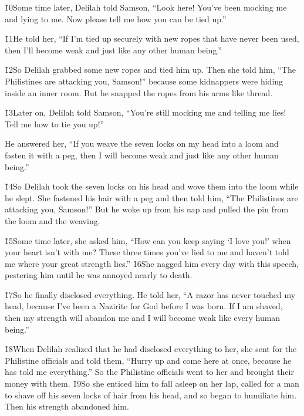 \v{10}Some time later, Delilah told Samson, ``Look here! You've been mocking me and lying to me. Now please tell me how you can be tied up.''

\v{11}He told her, ``If I'm tied up securely with new ropes that have never been used, then I'll become weak and just like any other human being.''

\v{12}So Delilah grabbed some new ropes and tied him up. Then she told him, ``The Philistines are attacking you, Samson!'' because some kidnappers were hiding inside an inner room. But he snapped the ropes from his arms like thread.

\v{13}Later on, Delilah told Samson, ``You're still mocking me and telling me lies! Tell me how to tie you up!''

He answered her, ``If you weave the seven locks on my head into a loom and fasten it with a peg, then I will become weak and just like any other human being.''

\v{14}So Delilah took the seven locks on his head and wove them into the loom while he slept. She fastened his hair with a peg and then told him, ``The Philistines are attacking you, Samson!'' But he woke up from his nap and pulled the pin from the loom and the weaving.

\v{15}Some time later, she asked him, ``How can you keep saying `I love you!' when your heart isn't with me? These three times you've lied to me and haven't told me where your great strength lies.'' \v{16}She nagged him every day with this speech, pestering him until he was annoyed nearly to death.

\v{17}So he finally disclosed everything. He told her, ``A razor has never touched my head, because I've been a Nazirite for God before I was born. If I am shaved, then my strength will abandon me and I will become weak like every human being.''

\v{18}When Delilah realized that he had disclosed everything to her, she sent for the Philistine officials and told them, ``Hurry up and come here at once, because he has told me everything.'' So the Philistine officials went to her and brought their money with them. \v{19}So she enticed him to fall asleep on her lap, called for a man to shave off his seven locks of hair from his head, and so began to humiliate him. Then his strength abandoned him.

